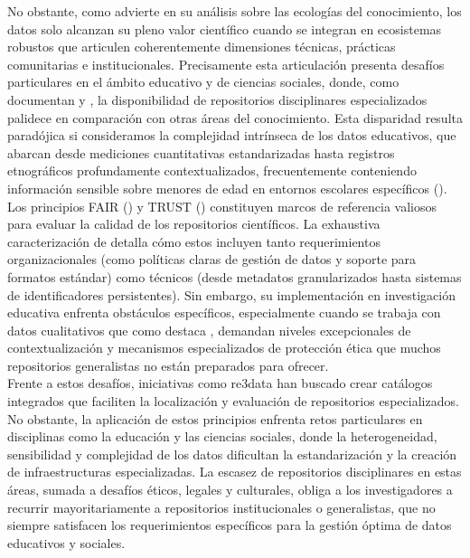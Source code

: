 \documentclass[runningheads]{llncs}
\begin{document}
No obstante, como advierte \cite{borgman2016} en su análisis sobre las ecologías del conocimiento, los datos solo alcanzan su pleno valor científico cuando se integran en ecosistemas robustos que articulen coherentemente dimensiones técnicas, prácticas comunitarias e institucionales. Precisamente esta articulación presenta desafíos particulares en el ámbito educativo y de ciencias sociales, donde, como documentan \cite{kraehmer2023} y \cite{gray2023}, la disponibilidad de repositorios disciplinares especializados palidece en comparación con otras áreas del conocimiento. Esta disparidad resulta paradójica si consideramos la complejidad intrínseca de los datos educativos, que abarcan desde mediciones cuantitativas estandarizadas hasta registros etnográficos profundamente contextualizados, frecuentemente conteniendo información sensible sobre menores de edad en entornos escolares específicos (\cite{gomes2022}).\\

Los principios FAIR (\cite{wilkinson2016}) y TRUST (\cite{Lin2020TRUST}) constituyen marcos de referencia valiosos para evaluar la calidad de los repositorios científicos. La exhaustiva caracterización de \cite{Behnke2020FAIRfeatures} detalla cómo estos incluyen tanto requerimientos organizacionales (como políticas claras de gestión de datos y soporte para formatos estándar) como técnicos (desde metadatos granularizados hasta sistemas de identificadores persistentes). Sin embargo, su implementación en investigación educativa enfrenta obstáculos específicos, especialmente cuando se trabaja con datos cualitativos que como  destaca \cite{antonio}, demandan niveles excepcionales de contextualización y mecanismos especializados de protección ética que muchos repositorios generalistas no están preparados para ofrecer.\\

Frente a estos desafíos, iniciativas como re3data \cite{pampel2013} han buscado crear catálogos integrados que faciliten la localización y evaluación de repositorios especializados.\\

No obstante, la aplicación de estos principios enfrenta retos particulares en disciplinas como la educación y las ciencias sociales, donde la heterogeneidad, sensibilidad y complejidad de los datos dificultan la estandarización y la creación de infraestructuras especializadas. La escasez de repositorios disciplinares en estas áreas, sumada a desafíos éticos, legales y culturales, obliga a los investigadores a recurrir mayoritariamente a repositorios institucionales o generalistas, que no siempre satisfacen los requerimientos específicos para la gestión óptima de datos educativos y sociales.\\
\end{document}

